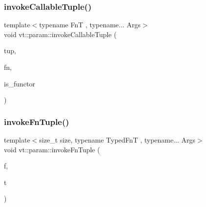 \mbox{\label{namespacevt_1_1param_a3aec8e4301c9035e3333fe9d186171fe}} 
\subsubsection{\texorpdfstring{invoke\+Callable\+Tuple()}{invokeCallableTuple()}}
{\footnotesize\ttfamily template$<$typename FnT , typename... Args$>$ \\
void vt\+::param\+::invoke\+Callable\+Tuple (\begin{DoxyParamCaption}\item[{std\+::tuple$<$ Args... $>$ \&}]{tup,  }\item[{FnT}]{fn,  }\item[{bool const \&}]{is\+\_\+functor }\end{DoxyParamCaption})}

\mbox{\label{namespacevt_1_1param_a8df465cc087697f52404eddfada30574}} 
\subsubsection{\texorpdfstring{invoke\+Fn\+Tuple()}{invokeFnTuple()}}
{\footnotesize\ttfamily template$<$size\+\_\+t size, typename Typed\+FnT , typename... Args$>$ \\
void vt\+::param\+::invoke\+Fn\+Tuple (\begin{DoxyParamCaption}\item[{Typed\+FnT}]{f,  }\item[{std\+::tuple$<$ Args... $>$}]{t }\end{DoxyParamCaption})}

